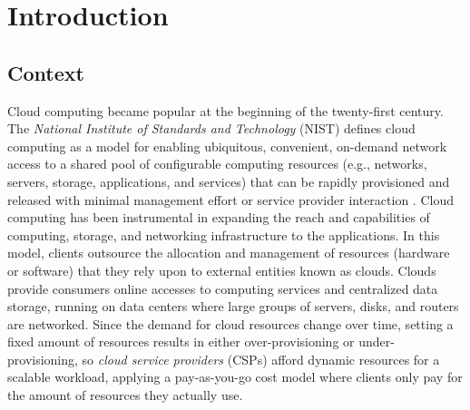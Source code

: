 \section{Introduction}\label{sec:Introduction}
\subsection{Context}
\noindent
Cloud computing became popular at the beginning of the twenty-first century. The \textit{National Institute of Standards and Technology} (NIST) defines cloud computing as a model for enabling ubiquitous, convenient, on-demand network access to a shared pool of configurable computing resources (e.g., networks, servers, storage, applications, and services) that can be rapidly provisioned and released with minimal management effort or service provider interaction \cite{mell2011nist}. Cloud computing has been instrumental in expanding the reach and capabilities of computing, storage, and networking infrastructure to the applications. In this model, clients outsource the allocation and management of resources (hardware or software) that they rely upon to external entities known as clouds. Clouds provide consumers online accesses to computing services and centralized data storage, running on data centers where large groups of servers, disks, and routers are networked. Since the demand for cloud resources change over time, setting a fixed amount of resources results in either over-provisioning or under-provisioning, so \textit{cloud service providers} (CSPs) afford dynamic resources for a scalable workload, applying a pay-as-you-go cost model where clients only pay for the amount of resources they actually use.\\
